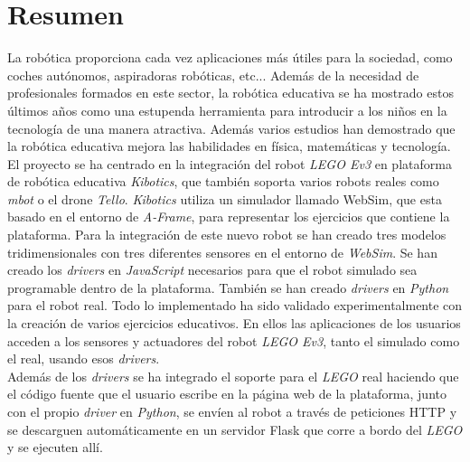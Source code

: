\chapter*{Resumen}

     La robótica proporciona cada vez aplicaciones más útiles para la sociedad, como coches autónomos, aspiradoras robóticas, etc... Además de la necesidad de profesionales formados en este sector, la robótica educativa se ha mostrado estos últimos años como una estupenda herramienta para introducir a los niños en la tecnología de una manera atractiva. Además varios estudios han demostrado que la robótica educativa mejora las habilidades en física, matemáticas y tecnología. 
\\  
  
El proyecto se ha centrado en la integración del robot \textit{LEGO Ev3} en plataforma de robótica educativa \textit{Kibotics}, que también soporta varios robots reales como \textit{mbot} o el drone \textit{Tello}. \textit{Kibotics} utiliza un simulador llamado WebSim, que esta basado en el entorno de \textit{A-Frame}, para representar los ejercicios que contiene la plataforma. Para la integración de este nuevo robot se han creado tres modelos tridimensionales con tres diferentes sensores en el entorno de \textit{WebSim}. Se han creado los \textit{drivers} en \textit{JavaScript} necesarios para que el robot simulado sea programable dentro de la plataforma. También se han creado \textit{drivers} en \textit{Python} para el robot real. Todo lo implementado ha sido validado experimentalmente con la creación de varios ejercicios educativos. En ellos las aplicaciones de los usuarios acceden a los sensores y actuadores del robot \textit{LEGO Ev3}, tanto el simulado como el real, usando esos \textit{drivers}.  \\
    
    
    Además de los \textit{drivers} se ha integrado el soporte para el \textit{LEGO} real haciendo que el código fuente que el usuario escribe en la página web de la plataforma, junto con el propio \textit{driver} en \textit{Python}, se envíen al robot a través de peticiones HTTP y se descarguen automáticamente en un servidor Flask que corre a bordo del \textit{LEGO} y se ejecuten allí.  